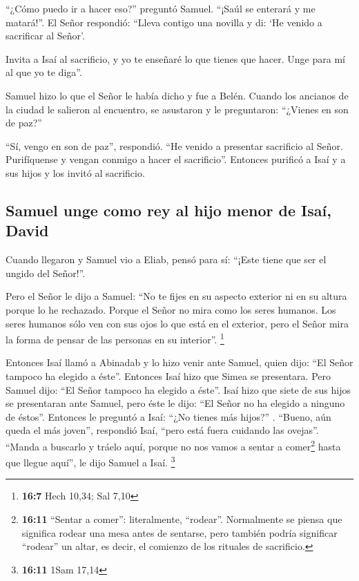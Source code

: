  ``¿Cómo puedo ir a hacer eso?'' preguntó Samuel. ``¡Saúl
se enterará y me matará!''. El Señor respondió: ``Lleva contigo una
novilla y di: `He venido a sacrificar al Señor'.

 Invita a Isaí al sacrificio, y yo te enseñaré lo que
tienes que hacer. Unge para mí al que yo te diga''.

 Samuel hizo lo que el Señor le había dicho y fue a Belén.
Cuando los ancianos de la ciudad le salieron al encuentro, se asustaron
y le preguntaron: ``¿Vienes en son de paz?''

 ``Sí, vengo en son de paz'', respondió. ``He venido a
presentar sacrificio al Señor. Purifíquense y vengan conmigo a hacer el
sacrificio''. Entonces purificó a Isaí y a sus hijos y los invitó al
sacrificio.

\hypertarget{samuel-unge-como-rey-al-hijo-menor-de-isauxed-david}{%
\subsection{Samuel unge como rey al hijo menor de Isaí,
David}\label{samuel-unge-como-rey-al-hijo-menor-de-isauxed-david}}

 Cuando llegaron y Samuel vio a Eliab, pensó para sí:
``¡Este tiene que ser el ungido del Señor!''.

 Pero el Señor le dijo a Samuel: ``No te fijes en su
aspecto exterior ni en su altura porque lo he rechazado. Porque el Señor
no mira como los seres humanos. Los seres humanos sólo ven con sus ojos
lo que está en el exterior, pero el Señor mira la forma de pensar de las
personas en su interior''. \footnote{\textbf{16:7} Hech 10,34; Sal 7,10}

 Entonces Isaí llamó a Abinadab y lo hizo venir ante
Samuel, quien dijo: ``El Señor tampoco ha elegido a éste''.
 Entonces Isaí hizo que Simea se presentara. Pero Samuel
dijo: ``El Señor tampoco ha elegido a éste''.  Isaí hizo
que siete de sus hijos se presentaran ante Samuel, pero éste le dijo:
``El Señor no ha elegido a ninguno de éstos''.  Entonces
le preguntó a Isaí: ``¿No tienes más hijos?'' . ``Bueno, aún queda el
más joven'', respondió Isaí, ``pero está fuera cuidando las ovejas''.
``Manda a buscarlo y tráelo aquí, porque no nos vamos a sentar a
comer\footnote{\textbf{16:11} ``Sentar a comer'': literalmente,
  ``rodear''. Normalmente se piensa que significa rodear una mesa antes
  de sentarse, pero también podría significar ``rodear'' un altar, es
  decir, el comienzo de los rituales de sacrificio.} hasta que llegue
aquí'', le dijo Samuel a Isaí. \footnote{\textbf{16:11} 1Sam 17,14}

